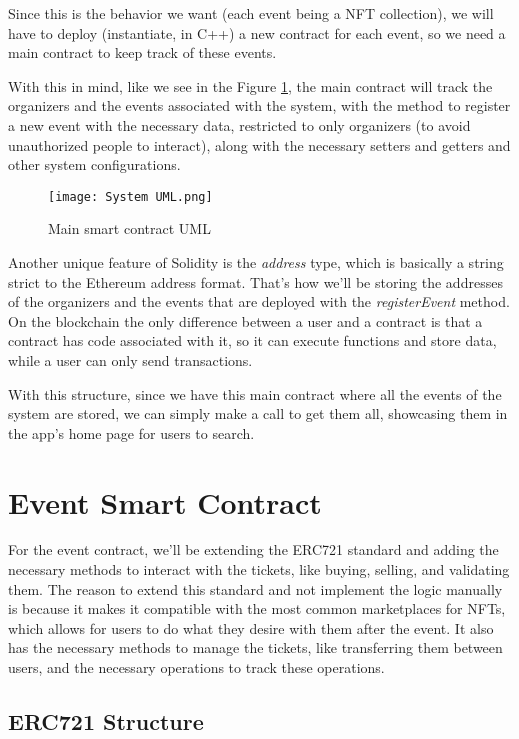 Since this is the behavior we want (each event being a NFT collection), we will have to deploy (instantiate, in C++) a new contract for each event, so we need a main contract to keep track of these events.

With this in mind, like we see in the Figure \ref{fig:system_uml}, the main contract will track the organizers and the events associated with the system, with the method to register a new event with the necessary data, restricted to only organizers (to avoid unauthorized people to interact), along with the necessary setters and getters and other system configurations.

\begin{figure}[H]
    \texttt{[image: System UML.png]}
    \centering
    \caption{Main smart contract UML}
    \label{fig:system_uml}
\end{figure}

Another unique feature of Solidity is the \textit{address} type, which is basically a string strict to the Ethereum address format. That's how we'll be storing the addresses of the organizers and the events that are deployed with the \textit{registerEvent} method. On the blockchain the only difference between a user and a contract is that a contract has code associated with it, so it can execute functions and store data, while a user can only send transactions.

With this structure, since we have this main contract where all the events of the system are stored, we can simply make a call to get them all, showcasing them in the app's home page for users to search.

\section{Event Smart Contract}
\label{sec:event_smart_contract}

For the event contract, we'll be extending the ERC721 standard and adding the necessary methods to interact with the tickets, like buying, selling, and validating them. The reason to extend this standard and not implement the logic manually is because it makes it compatible with the most common marketplaces for NFTs, which allows for users to do what they desire with them after the event. It also has the necessary methods to manage the tickets, like transferring them between users, and the necessary operations to track these operations.

\subsection{ERC721 Structure}
\label{subsec:erc721_structure}

